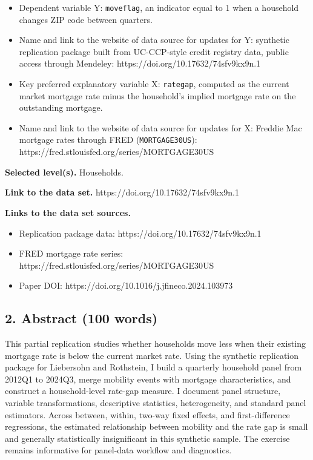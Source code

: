 \documentclass[a4paper,11pt]{article}
\renewcommand{\_}{\textunderscore\allowbreak}
\providecommand{\tightlist}{%
  \setlength{\itemsep}{0pt}\setlength{\parskip}{0pt}}
\begin{document}
\begin{itemize}
\tightlist
\item
  Dependent variable Y: \texttt{move\_flag}, an indicator equal to 1
  when a household changes ZIP code between quarters.
\item
  Name and link to the website of data source for updates for Y:
  synthetic replication package built from UC-CCP-style credit registry
  data, public access through Mendeley:
  https://doi.org/10.17632/74sfv9kx9n.1
\item
  Key preferred explanatory variable X: \texttt{rate\_gap}, computed as
  the current market mortgage rate minus the household's implied
  mortgage rate on the outstanding mortgage.
\item
  Name and link to the website of data source for updates for X: Freddie
  Mac mortgage rates through FRED (\texttt{MORTGAGE30US}):
  https://fred.stlouisfed.org/series/MORTGAGE30US
\end{itemize}

\textbf{Selected level(s).} Households.

\textbf{Link to the data set.} https://doi.org/10.17632/74sfv9kx9n.1

\textbf{Links to the data set sources.}

\begin{itemize}
\tightlist
\item
  Replication package data: https://doi.org/10.17632/74sfv9kx9n.1
\item
  FRED mortgage rate series:
  https://fred.stlouisfed.org/series/MORTGAGE30US
\item
  Paper DOI: https://doi.org/10.1016/j.jfineco.2024.103973
\end{itemize}

\hypertarget{abstract-100-words}{%
\subsection{2. Abstract (100 words)}\label{abstract-100-words}}

This partial replication studies whether households move less when their
existing mortgage rate is below the current market rate. Using the
synthetic replication package for Liebersohn and Rothstein, I build a
quarterly household panel from 2012Q1 to 2024Q3, merge mobility events
with mortgage characteristics, and construct a household-level rate-gap
measure. I document panel structure, variable transformations,
descriptive statistics, heterogeneity, and standard panel estimators.
Across between, within, two-way fixed effects, and first-difference
regressions, the estimated relationship between mobility and the rate
gap is small and generally statistically insignificant in this synthetic
sample. The exercise remains informative for panel-data workflow and
diagnostics.
\end{document}
